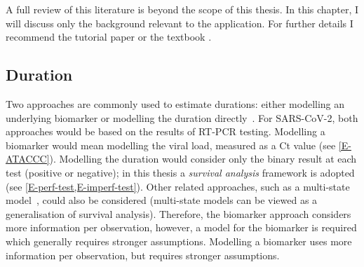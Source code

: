 \documentclass[thesis.tex]{subfiles}
\begin{document}
A full review of this literature is beyond the scope of this thesis.
In this chapter, I will discuss only the background relevant to the application.
For further details I recommend the tutorial paper \textcite{kretzschmarMathematical} or the textbook \textcite{keelingModeling}.


\subsection{Duration} \label{inc-prev:sec:duration}

Two approaches are commonly used to estimate durations: either modelling an underlying biomarker or modelling the duration directly~\autocite{sweetingEstimating}.
For SARS-CoV-2, both approaches would be based on the results of RT-PCR testing.
Modelling a biomarker would mean modelling the viral load, measured as a Ct value (see \cref{E-ATACCC}).
Modelling the duration would consider only the binary result at each test (positive or negative); in this thesis a \emph{survival analysis} framework is adopted (see \cref{E-perf-test,E-imperf-test}).
Other related approaches, such as a multi-state model~\autocite{jacksonMSM}, could also be considered (multi-state models can be viewed as a generalisation of survival analysis).
Therefore, the biomarker approach considers more information per observation, however, a model for the biomarker is required which generally requires stronger assumptions.
Modelling a biomarker uses more information per observation, but requires stronger assumptions.
\end{document}
